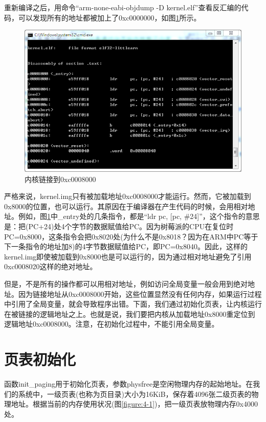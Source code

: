 \documentclass[main.tex]{subfiles}
\begin{document}
\begin{CJK*}{UTF8}{song}
\begin{code}
\label{code:4-2}
\inputminted[firstline=79,lastline=108,linenos,numbersep=5pt,frame=lines,framesep=2mm]{gas}{src/chapter04/kernel/entry.S}
\end{code}

重新编译之后，用命令“arm-none-eabi-objdump -D kernel.elf”查看反汇编的代码，可以发现所有的地址都被加上了0xc0000000，如图\ref{figure:4-5}所示。

\begin{figure}[htp]
\centering
\includegraphics[scale=0.5]{figures/4-5}
\caption{内核链接到0xc0008000}
\label{figure:4-5}
\end{figure}

严格来说，kernel.img只有被加载地址0xc0008000才能运行。然而，它被加载到0x8000的位置，也可以运行。其原因在于编译器在产生代码的时候，会用相对地址。例如，图\ref{figure:4-5}中\_entry处的几条指令，都是“ldr pc, [pc, \#24]”，这个指令的意思是：把(PC+24)处4个字节的数据赋值给PC。因为树莓派的CPU在复位时PC=0x8000，这条指令会把0x8020处(为什么不是0x8018？因为在ARM中PC等于下一条指令的地址加8)的4字节数据赋值给PC，即PC=0x8040。因此，这样的kernel.img即使被加载到0x8000也是可以运行的，因为通过相对地址避免了引用0xc0008020这样的绝对地址。

\par
但是，不是所有的操作都可以用相对地址，例如访问全局变量一般会用到绝对地址。因为链接地址从0xc0008000开始，这些位置显然没有任何内存，如果运行过程中引用了全局变量，就会导致程序出错。下面，我们通过初始化页表，让内核运行在被链接的逻辑地址之上。也就是说，我们要把内核从加载地址0x8000重定位到逻辑地址0xc0008000。注意，在初始化过程中，不能引用全局变量。

\section{页表初始化}
函数init\_paging用于初始化页表，参数physfree是空闲物理内存的起始地址。在我们的系统中，一级页表(也称为页目录)大小为16KiB，保存着4096张二级页表的物理地址。根据当前的内存使用状况(图\ref{figure:4-1})，把一级页表放物理内存0x4000处。


\end{CJK*}
\end{document}
